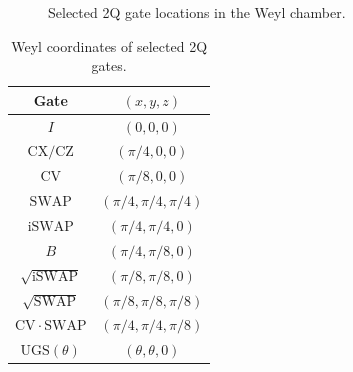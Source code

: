 \begin{figure}[!t]\centering
\makeatletter{}\makeatother
{}
\caption{Selected 2Q gate locations in the Weyl chamber.}\label{fig:2}
\end{figure}
\begin{table}[!t]
\begingroup
\makeatletter{}\makeatother
\centering
\caption{Weyl coordinates of selected 2Q gates.}\label{tab:weyl}
\begingroup\small
\setlength{\tabcolsep}{7pt}\renewcommand{\arraystretch}{1.05}
\begin{tabular}{cc}
\toprule
Gate & $(x,y,z)$\\
\midrule
$I$ & $(0,0,0)$ \\
$\mathrm{CX/CZ}$ & $(\pi/4,0,0)$ \\
$\mathrm{CV}$ & $(\pi/8,0,0)$ \\
$\mathrm{SWAP}$ & $(\pi/4,\pi/4,\pi/4)$ \\
$\mathrm{iSWAP}$ & $(\pi/4,\pi/4,0)$ \\
$B$ & $(\pi/4,\pi/8,0)$ \\
$\sqrt{\mathrm{iSWAP}}$ & $(\pi/8,\pi/8,0)$ \\
$\sqrt{\mathrm{SWAP}}$ & $(\pi/8,\pi/8,\pi/8)$ \\
$\mathrm{CV}\!\cdot\!\mathrm{SWAP}$ & $(\pi/4,\pi/4,\pi/8)$ \\
$\mathrm{UGS}(\theta)$ & $(\theta,\theta,0)$ \\
\bottomrule
\end{tabular}\par
\endgroup
\endgroup
\end{table}
